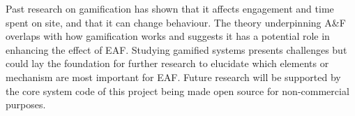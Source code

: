 Past research on gamification has shown that it affects engagement and time spent on site, and that it can change behaviour. The theory underpinning A\&F overlaps with how gamification works and suggests it has a potential role in enhancing the effect of \gls{EAF}. Studying gamified systems presents challenges but could lay the foundation for further research to elucidate which elements or mechanism are most important for \gls{EAF}. Future research will be supported by the core system code of this project being made open source for non-commercial purposes.